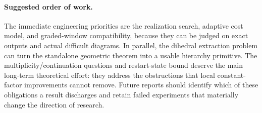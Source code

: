 \paragraph{Suggested order of work.}
The immediate engineering priorities are the realization search,
adaptive cost model, and graded-window compatibility, because they can
be judged on exact outputs and actual difficult diagrams. In parallel,
the dihedral extraction problem can turn the standalone geometric
theorem into a usable hierarchy primitive. The multiplicity/continuation
questions and restart-state bound deserve the main long-term theoretical
effort: they address the obstructions that local constant-factor
improvements cannot remove. Future reports should identify which of
these obligations a result discharges and retain failed experiments
that materially change the direction of research.
